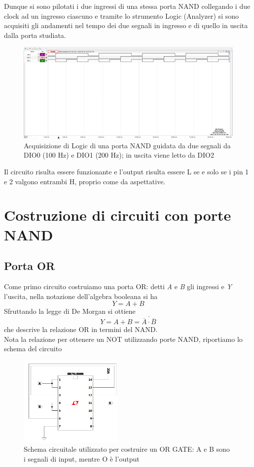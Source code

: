 \documentclass[10pt, a4paper, italian]{article}
\begin{document}
Dunque si sono pilotati i due ingressi di una stessa porta NAND collegando
i due clock ad un ingresso ciascuno e tramite lo strumento Logic (Analyzer)
si sono acquisiti gli andamenti nel tempo dei due segnali in ingresso e di
quello in uscita dalla porta studiata.
\begin{figure}[htbp]
\centering
	\includegraphics[scale=0.4]{nand_time}
	\caption{Acquisizione di Logic di una porta NAND guidata da due segnali da
	DIO0 (100 Hz) e DIO1 (200 Hz); in uscita viene letto da DIO2}
	\label{nand_time}
\end{figure}
Il circuito risulta essere funzionante e l'output risulta essere L se e solo
se i pin 1 e 2 valgono entrambi H, proprio come da aspettative.

\section{Costruzione di circuiti con porte NAND}
\subsection{Porta OR}
Come primo circuito costruiamo una porta OR: detti \textit{A} e \textit{B}
gli ingressi e \textit{Y} l'uscita, nella notazione dell'algebra booleana si ha
\[
    Y = A + B
\]
Sfruttando la legge di De Morgan si ottiene
\[
    Y = A + B = \overline{\overline{A}\cdot\overline{B}}
\]
che descrive la relazione OR in termini del NAND.\\
Nota la relazione per ottenere un NOT utilizzando porte NAND, riportiamo lo schema del circuito
\begin{figure}[htbp]
    \centering
    \includegraphics[width=0.45\textwidth]{NAND_OR}
    \caption{\label{fig: OR} Schema circuitale utilizzato per costruire un OR GATE: A e B sono i segnali di input, mentre O è l'output}
\end{figure}
\end{document}
